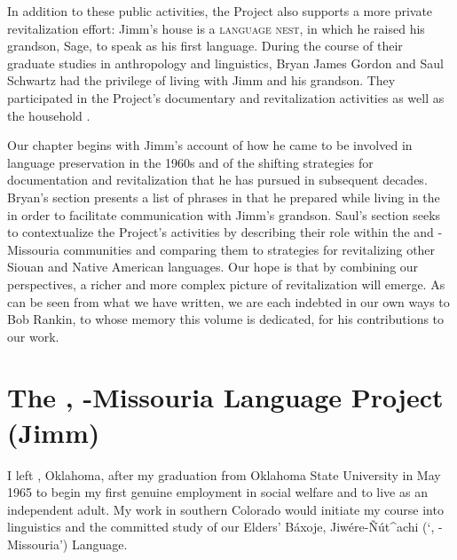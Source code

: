 \documentclass[output=paper]{LSP/langsci}
\begin{document}
In addition to these public activities, the Project also supports a more private revitalization effort: Jimm's house is a \textsc{language nest}, in which he raised his grandson, Sage, to speak  as his first language. During the course of their graduate studies in anthropology and linguistics, Bryan James Gordon and Saul Schwartz had the privilege of living with Jimm and his grandson. They participated in the Project's documentary and revitalization activities as well as the household .

Our chapter begins with Jimm's account of how he came to be involved in  language preservation in the 1960s and of the shifting strategies for documentation and revitalization that he has pursued in subsequent decades. Bryan's section presents a list of phrases in  that he prepared while living in the  in order to facilitate communication with Jimm's grandson. Saul's section seeks to contextualize the Project's activities by describing their role within the  and -Missouria communities and comparing them to strategies for revitalizing other Siouan and Native American languages. Our hope is that by combining our perspectives, a richer and more complex picture of  revitalization will emerge. As can be seen from what we have written, we are each indebted in our own ways to Bob Rankin, to whose memory this volume is dedicated, for his contributions to our work.

\section{The , -Missouria Language Project (Jimm)}
I left , Oklahoma, after my graduation from Oklahoma State University in May 1965 to begin my first genuine employment in social welfare and to live as an independent adult. My work in southern Colorado would initiate my course into linguistics and the committed study of our Elders' Báxoje, Jiwére-\~Nút\^{ }achi (`, -Mis\-sou\-ria') Language.
\end{document}
